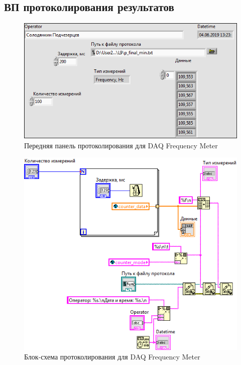 \documentclass[a4paper,14pt]{article}
\begin{document}
\subsection{ВП протоколирования результатов}

\begin{figure}[H]
	\centering
	\includegraphics[width=\linewidth]{image/dfm_scaner_vi}
	\caption{Передняя панель протоколирования для DAQ Frequency Meter}\label{img:dfm_scaner_vi}
\end{figure}

\begin{figure}[H]
	\centering
	\includegraphics[width=\linewidth]{image/dfm_scanner_schema}
	\caption{Блок-схема протоколирования для DAQ Frequency Meter}\label{img:dfm_scanner_schema}
\end{figure}
\end{document}
